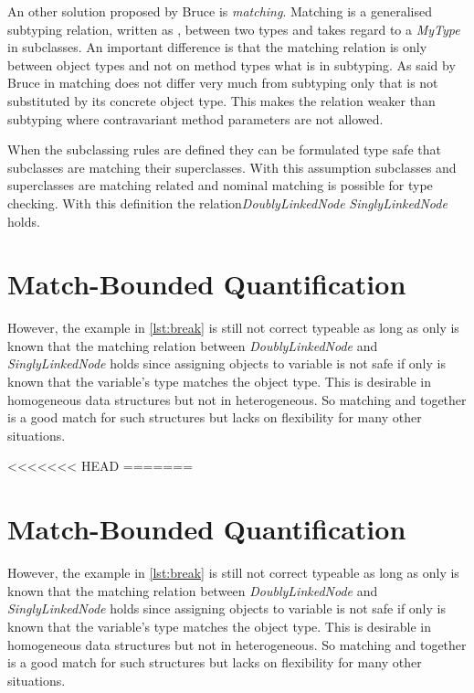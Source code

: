 An other solution proposed by Bruce \cite{bruce_binary_1995} is
\emph{matching}. Matching is a generalised subtyping relation, written
as \match, between two types and takes regard to a \emph{MyType} in
subclasses. An important difference is that the matching relation is only
between object types and not on method types what is in subtyping. As
said by Bruce in \cite{bruce_foundations_2002} matching does not differ
very much from subtyping only that \MyType is not substituted by its
concrete object type. This makes the relation weaker than subtyping
where contravariant method parameters are not allowed.

When the subclassing rules are defined they can be formulated
type safe that subclasses are matching their superclasses. With
this assumption subclasses and superclasses are matching related and
nominal matching is possible for type checking. With this definition
the relation\emph{DoublyLinkedNode} \match \emph{SinglyLinkedNode} holds.






\section{Match-Bounded Quantification}
However, the example in \autoref{lst:break} is still not correct
typeable as long as only is known that the matching relation between
\emph{DoublyLinkedNode} and \emph{SinglyLinkedNode} holds since assigning
objects to variable is not safe if only is known that the variable's type
matches the object type. This is desirable in homogeneous data structures
but not in heterogeneous. So matching and \MyType together is a good match
for such structures but lacks on flexibility for many other situations.

<<<<<<< HEAD
=======
\section{Match-Bounded Quantification}
However, the example in \autoref{lst:break} is still not correct
typeable as long as only is known that the matching relation between
\emph{DoublyLinkedNode} and \emph{SinglyLinkedNode} holds since assigning
objects to variable is not safe if only is known that the variable's type
matches the object type. This is desirable in homogeneous data structures
but not in heterogeneous. So matching and \MyType together is a good match
for such structures but lacks on flexibility for many other situations.

